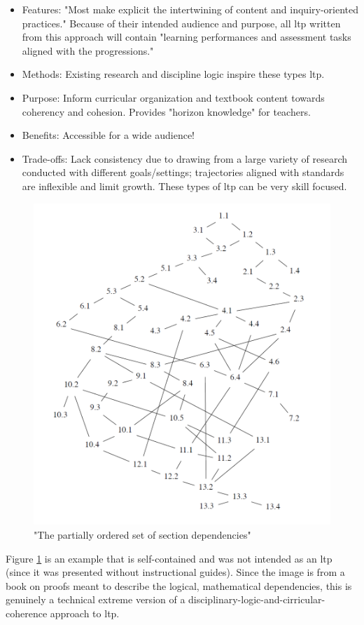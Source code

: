 \documentclass{TC}
\begin{document}
\begin{multicols}{2}
\begin{itemize} 
\item Features: "Most make explicit the intertwining of content and inquiry-oriented practices." Because of their intended audience and purpose, all \gls{ltp} written from this approach will contain "learning performances and assessment tasks aligned with the progressions."
\item Methods: Existing research and discipline logic inspire these types \gls{ltp}.
\item Purpose: Inform curricular organization and textbook content towards coherency and cohesion. Provides "horizon knowledge" for teachers. 
\item Benefits: Accessible for a wide audience!
\item Trade-offs: Lack consistency due to drawing from a large variety of research conducted with different goals/settings; trajectories aligned with standards are inflexible and limit growth. These types of \gls{ltp} can be very skill focused.  
 \end{itemize}
 \end{multicols}

\begin{figure}[h]
\centering
\includegraphics[width=.6\textwidth]{AoP_poset_of_section_dependencies} 
 \caption{"The partially ordered set of section dependencies" \parencite{beck_computing_2016}
\label{disciplinary_logic_LT_example}}
 \end{figure}
  
\begin{remark} Figure \ref{disciplinary_logic_LT_example} is an example that is self-contained and was not intended as an \gls{ltp} (since it was presented without instructional guides). Since the image is from a book on proofs meant to describe the logical, mathematical dependencies, this is genuinely a technical extreme version of a disciplinary-logic-and-cirricular-coherence approach to \gls{ltp}. \end{remark}
\end{document}
